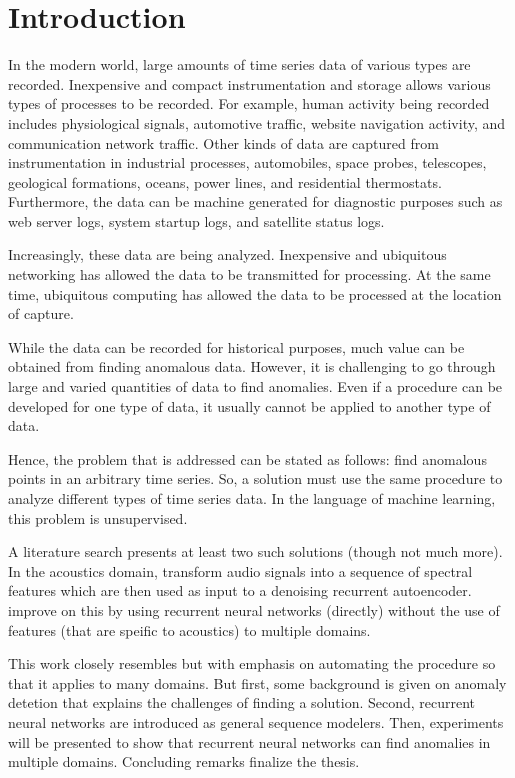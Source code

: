 \chapter[intro]{Introduction}


In the modern world, large amounts of time series data of various types are recorded.  Inexpensive and compact instrumentation and storage allows various types of processes to be recorded. For example, human activity being recorded includes physiological signals, automotive traffic, website navigation activity, and communication network traffic. Other kinds of data are captured from instrumentation in industrial processes, automobiles, space probes, telescopes, geological formations, oceans, power lines, and residential thermostats. Furthermore, the data can be machine generated for diagnostic purposes such as web server logs, system startup logs, and satellite status logs.

Increasingly, these data are being analyzed. Inexpensive and ubiquitous networking has allowed the data to be transmitted for processing. At the same time, ubiquitous computing has allowed the data to be processed at the location of capture.

While the data can be recorded for historical purposes, much value can be obtained from finding anomalous data. However, it is challenging to go through large and varied quantities of data to find anomalies. Even if a procedure can be developed for one type of data, it usually cannot be applied to another type of data.

Hence, the problem that is addressed can be stated as follows: find anomalous points in an arbitrary time series. So, a solution must use the same procedure to analyze different types of time series data. In the language of machine learning, this problem is unsupervised.

A literature search presents at least two such solutions (though not much more). In the acoustics domain, \cite{Marchi2015} transform audio signals into a sequence of spectral features which are then used as input to a denoising recurrent autoencoder. \cite{Malhotra2015} improve on this by using recurrent neural networks (directly) without the use of features (that are speific to acoustics) to multiple domains.

This work closely resembles \cite{Malhotra2015} but with emphasis on automating the procedure so that it applies to many domains. But first, some background is given on anomaly detetion that explains the challenges of finding a solution. Second, recurrent neural networks are introduced as general sequence modelers. Then, experiments will be presented to show that recurrent neural networks can find anomalies in multiple domains. Concluding remarks finalize the thesis.


